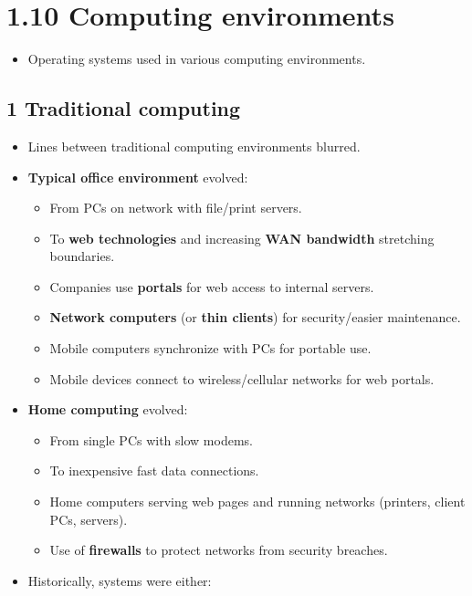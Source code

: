 \documentclass{article}
\begin{document}
\section*{1.10 Computing environments}
\begin{itemize}
    \item Operating systems used in various computing environments.
\end{itemize}

\subsection*{1 Traditional computing}
\begin{itemize}
    \item Lines between traditional computing environments blurred.
    \item \textbf{Typical office environment} evolved:
    \begin{itemize}
        \item From PCs on network with file/print servers.
        \item To \textbf{web technologies} and increasing \textbf{WAN bandwidth} stretching boundaries.
        \item Companies use \textbf{portals} for web access to internal servers.
        \item \textbf{Network computers} (or \textbf{thin clients}) for security/easier maintenance.
        \item Mobile computers synchronize with PCs for portable use.
        \item Mobile devices connect to wireless/cellular networks for web portals.
    \end{itemize}
    \item \textbf{Home computing} evolved:
    \begin{itemize}
        \item From single PCs with slow modems.
        \item To inexpensive fast data connections.
        \item Home computers serving web pages and running networks (printers, client PCs, servers).
        \item Use of \textbf{firewalls} to protect networks from security breaches.
    \end{itemize}
    \item Historically, systems were either:

\end{itemize}
\end{document}
